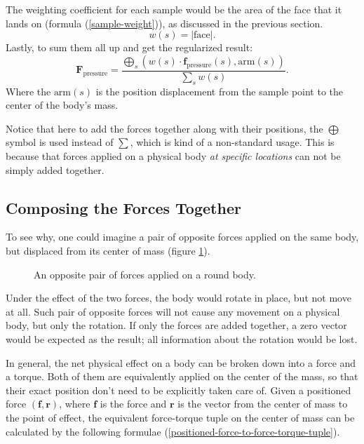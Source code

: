 The weighting coefficient for each sample would be the area of the face that it lands on (formula (\ref{sample-weight})), as discussed in the previous section.
\begin{equation}
	w(s)=|\text{face}|.
	\label{sample-weight}
\end{equation}
Lastly, to sum them all up and get the regularized result:
\begin{equation}
	\mathbf{F}_{\text{pressure}}=\frac
		{
			\bigoplus_{s}
			\left(
				w(s)\cdot\mathbf{f}_{\text{pressure}}(s)
				,
				\text{arm}(s)
			\right)
		}
		{\sum_{s}w(s)}.
	\label{net-pressure-force}
\end{equation}
Where the $\text{arm}(s)$ is the position displacement from the sample point to the center of the body's mass.

Notice that here to add the forces together along with their positions, the $\bigoplus$ symbol is used instead of $\sum$, which is kind of a non-standard usage.
This is because that forces applied on a physical body \emph{at specific locations} can not be simply added together.

\subsection{Composing the Forces Together}

To see why, one could imagine a pair of opposite forces applied on the same body, but displaced from its center of mass (figure \ref{force-pair}).

\begin{figure}[h]
	\centering
	\scalebox{0.8}{
		\begin{tikzpicture}
			\filldraw[color=black, fill=lightgray, line width=1pt] (0,0) circle (2);
			\draw[-latex, line width=1pt] (2,0) -- ++(0,-2);
			\draw[-latex, line width=1pt] (-2,0) -- ++(0,+2);
		\end{tikzpicture}
	}
	\caption{An opposite pair of forces applied on a round body.}
	\label{force-pair}
\end{figure}

Under the effect of the two forces, the body would rotate in place, but not move at all.
Such pair of opposite forces will not cause any movement on a physical body, but only the rotation.
If only the forces are added together, a zero vector would be expected as the result; all information about the rotation would be lost.

In general, the net physical effect on a body can be broken down into a force and a torque.
Both of them are equivalently applied on the center of the mass, so that their exact position don't need to be explicitly taken care of.
Given a positioned force $(\mathbf{f}, \mathbf{r})$, where $\mathbf{f}$ is the force and $\mathbf{r}$ is the vector from the center of mass to the point of effect, the equivalent force-torque tuple on the center of mass can be calculated by the following formulae (\ref{positioned-force-to-force-torque-tuple}).

